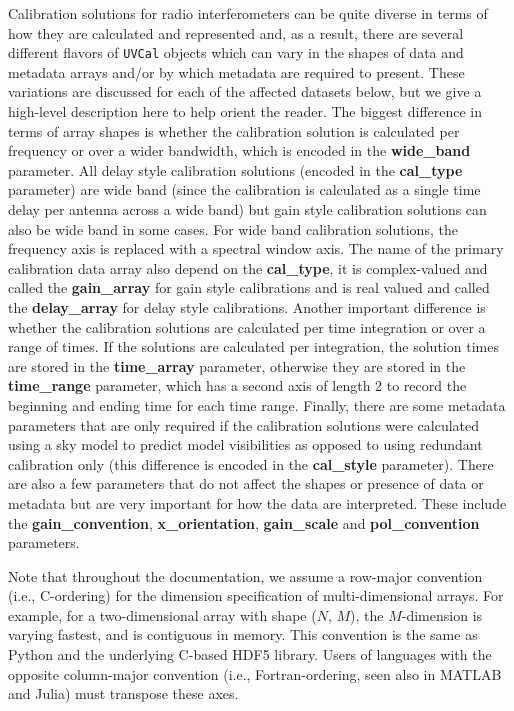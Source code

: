 \documentclass[11pt, oneside]{article}
\begin{document}
Calibration solutions for radio interferometers can be quite diverse in terms of how
they are calculated and represented and, as a result, there are several different flavors
of \texttt{UVCal} objects which can vary in the shapes of data and metadata arrays
and/or by which metadata are required to present. These variations are discussed for
each of the affected datasets below, but we give a high-level description here to
help orient the reader. The biggest difference in terms of array shapes is whether the
calibration solution is calculated per frequency or over a wider bandwidth, which is
encoded in the \textbf{wide\_band} parameter. All delay style calibration solutions
(encoded in the \textbf{cal\_type} parameter) are wide band (since the calibration
is calculated as a single time delay per antenna across a wide band) but gain style
calibration solutions can also be wide band in some cases. For wide band calibration
solutions, the frequency axis is replaced with a spectral window axis. The name of the
primary calibration data array also depend on the \textbf{cal\_type}, it is complex-valued
and called the \textbf{gain\_array} for gain style calibrations and is real valued and
called the \textbf{delay\_array} for delay style calibrations. Another important difference
is whether the calibration solutions are calculated per time integration or over a range
of times. If the solutions are calculated per integration, the solution times are stored in the
\textbf{time\_array} parameter, otherwise they are stored in the \textbf{time\_range}
parameter, which has a second axis of length 2 to record the beginning and ending
time for each time range. Finally, there are some metadata parameters that are
only required if the calibration solutions were calculated using a sky model to predict
model visibilities as opposed to using redundant calibration only (this difference is
encoded in the \textbf{cal\_style} parameter). There are also a few parameters that
do not affect the shapes or presence of data or metadata but are very important for
how the data are interpreted. These include the \textbf{gain\_convention},
\textbf{x\_orientation}, \textbf{gain\_scale} and \textbf{pol\_convention} parameters.

Note that throughout the documentation, we assume a row-major convention (i.e.,
C-ordering) for the dimension specification of multi-dimensional arrays. For
example, for a two-dimensional array with shape ($N$, $M$), the $M$-dimension is
varying fastest, and is contiguous in memory. This convention is the same as
Python and the underlying C-based HDF5 library. Users of languages with the
opposite column-major convention (i.e., Fortran-ordering, seen also in MATLAB
and Julia) must transpose these axes.
\end{document}
